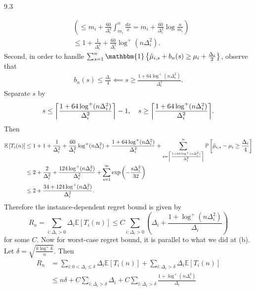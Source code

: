 \documentclass[10pt]{article}
\theoremstyle{definition}
\newenvironment{solution*}[1]{%
  \IfBlankTF{#1}
    {\renewcommand{\themanualsolutioninner}{\unskip}}
    {\renewcommand\themanualsolutioninner{#1}}%
  \manualsolutioninner
}{\endmanualsolutioninner}
\DeclarePairedDelimiter{\ceil}{\lceil}{\rceil}
\begin{document}
\begin{solution*}{9.3}
\begin{itemize}
\begin{align*}
            &\left(\leq m_i + \frac{60}{\Delta_i^2} \int_{m_i}^n \frac{dx}{x} = m_i + \frac{60}{\Delta_i^2} \log \frac{n}{m_i} \right)\\
            &\leq 1 + \frac{1}{\Delta_i^2} + \frac{60}{\Delta_i^2} \log^+ (n\Delta_i^2).
        \end{align*}
        Second, in order to handle $\sum_{s=1}^n \mathbbm{1}\left\{\hat{\mu}_{i,s}+b_n(s) \geq \mu_i + \frac{\Delta_i}{2}\right\}$, observe that
        \begin{align*}
            b_n(s) \leq \frac{\Delta_i}{4} \impliedby s \geq \frac{1 + 64 \log^+ (n\Delta_i^2)}{\Delta_i^2}.
        \end{align*}
        Separate $s$ by
        \begin{equation*}
            s \leq \ceil*{\frac{1 + 64 \log^+ (n\Delta_i^2)}{\Delta_i^2}} - 1, \quad s \geq \ceil*{\frac{1 + 64 \log^+ (n\Delta_i^2)}{\Delta_i^2}}.
        \end{equation*}
        Then
        \begin{align*}
            \mathbb{E}\left[T_i (n) \right] &\leq 1 + 1 + \frac{1}{\Delta_i^2} + \frac{60}{\Delta_i^2} \log^+ (n\Delta_i^2) + \frac{1 + 64\log^+ (n\Delta_i^2)}{\Delta_i^2} + \sum_{s = \ceil*{\frac{1 + 64 \log^+ (n\Delta_i^2)}{\Delta_i^2}}}^n \mathbb{P} \left[ \hat{\mu}_{i,s} - \mu_i \geq \frac{\Delta_i}{4}\right] \\
            &\leq 2 + \frac{2}{\Delta_i^2} + \frac{124 \log^+ (n\Delta_i^2)}{\Delta_i^2} + \sum_{s=1}^\infty \exp\left(-\frac{s \Delta_i^2}{32} \right) \\
            &\leq 2 + \frac{34 + 124 \log^+ (n\Delta_i^2)}{\Delta_i^2}.
        \end{align*}
        Therefore the instance-dependent regret bound is given by
        \begin{equation*}
            R_n = \sum_{i: \Delta_i > 0} \Delta_i \mathbb{E}[T_i (n)] \leq C \sum_{i: \Delta_i > 0} \left( \Delta_i + \frac{1+ \log^+ (n\Delta_i^2)}{\Delta_i} \right)
        \end{equation*}
        for some $C$.
        Now for worst-case regret bound, it is parallel to what we did at (b).
        Let $\delta = \sqrt{\frac{k\log^+ k}{n}}$.
        Then
        \begin{align*}
            R_n &=\sum_{i:0<\Delta_i \leq \delta} \Delta_i \mathbb{E}\left[T_i(n) \right] + \sum_{i:\Delta_i > \delta} \Delta_i \mathbb{E} \left[ T_i (n) \right] \\
            &\leq n \delta + C \sum_{i: \Delta_i > \delta} \Delta_i + C \sum_{i: \Delta_i > \delta} \frac{1 + \log^+ (n\Delta_i^2)}{\Delta_i} \\

\end{align*}
\end{itemize}
\end{solution*}
\end{document}
